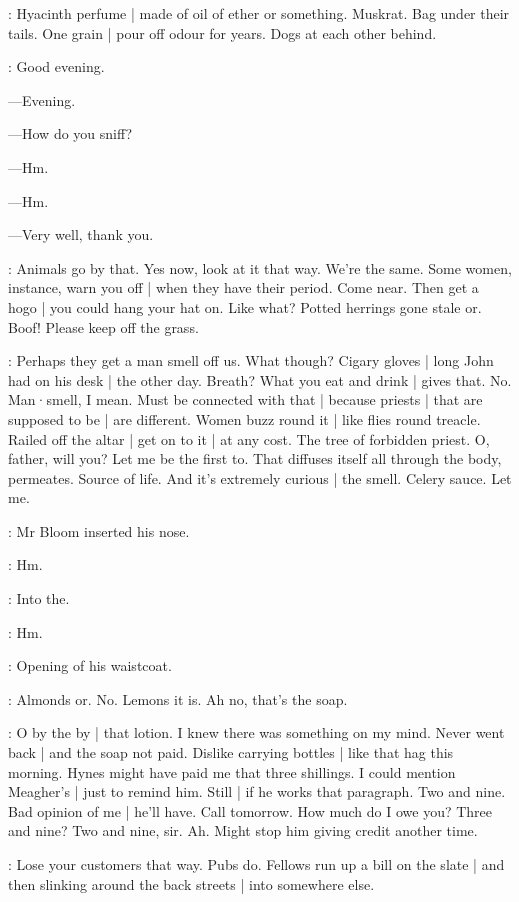 \BloomAbstract:
Hyacinth perfume |
made of oil of ether or something.
Muskrat.
Bag under their tails.
One grain |
pour off odour for years.
Dogs at each other behind.

\BloomOther:
Good evening.

---Evening.

---How do you sniff?

---Hm.

---Hm.

---Very well,
thank you.

\BloomAbstract:
Animals go by that.%
Yes now,
look at it that way.
We're the same.
Some women,
instance,
warn you off |
when they have their period.
Come near.
Then get a hogo |
you could hang your hat on.
Like what?
Potted herrings gone stale or.
Boof!
Please keep off the grass.

\BloomAbstract:
Perhaps they get a man smell off us.
What though?
Cigary gloves |
long John had on his desk |
the other day.
Breath?
What you eat and drink |
gives that.
No.
Man·smell,
I mean.
Must be connected with that |
because priests |
that are supposed to be |
are different.
Women buzz round it |
like flies round treacle.
Railed off the altar |
get on to it |
at any cost.
The tree of forbidden priest.
O,
father,
will you?
Let me be the first to.
That diffuses itself all through the body,
permeates.%
Source of life.
And it's extremely curious |
the smell.
Celery sauce.
Let me.

:
Mr Bloom inserted his nose.

\BloomInt:
Hm.

:
Into the.

\BloomInt:
Hm.

:
Opening of his waistcoat.

\BloomCurrent:
Almonds or.
No.
Lemons
it is.
Ah no,
that's the soap.

\BloomToday:
O by the by |
that lotion.
I knew there was something on my mind.
Never went back |
and the soap not paid.
Dislike carrying bottles |
like that hag this morning.
Hynes might have paid me that three shillings.
I could mention Meagher's |
just to remind him.
Still |
if he works that paragraph.
Two and nine.
Bad opinion of me |
he'll have.
Call tomorrow.
How much do I owe you?
Three and nine?
Two and nine,
sir.
Ah.
Might stop him giving credit another time.

\BloomAbstract:
Lose your customers that way.%
Pubs do.
Fellows run up a bill on the slate |
and then slinking around the back streets |
into somewhere else.


